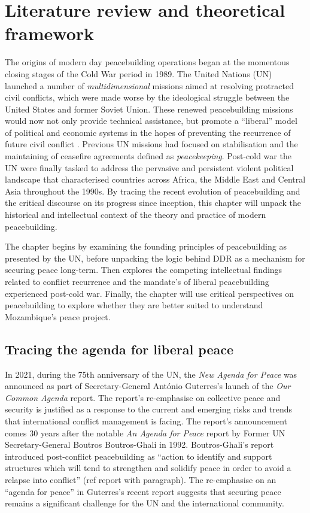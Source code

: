 \chapter{Literature review and theoretical framework}
\label{chp:Lit}

The origins of modern day peacebuilding operations began at the momentous closing stages of the Cold War period in 1989. The United Nations (UN) launched a number of \emph{multidimensional} missions aimed at resolving protracted civil conflicts, which were made worse by the ideological struggle between the United States and former Soviet Union. These renewed peacebuilding missions would now not only provide technical assistance, but promote a ``liberal'' model of political and economic systems in the hopes of preventing the recurrence of future civil conflict \citep[chap.~2]{paris2004war}. Previous UN missions had focused on stabilisation and the maintaining of ceasefire agreements defined as \emph{peacekeeping}. Post-cold war the UN were finally tasked to address the pervasive and persistent violent political landscape that characterised countries across Africa, the Middle East and Central Asia throughout the 1990s. By tracing the recent evolution of peacebuilding and the critical discourse on its progress since inception, this chapter will unpack the historical and intellectual context of the theory and practice of modern peacebuilding. 

The chapter begins by examining the founding principles of peacebuilding as presented by the UN, before unpacking the logic behind DDR as a mechanism for securing peace long-term. Then explores the competing intellectual findings related to conflict recurrence and the mandate's of liberal peacebuilding experienced post-cold war. Finally, the chapter will use critical perspectives on peacebuilding to explore whether they are better suited to understand Mozambique's peace project.  

\section{Tracing the agenda for liberal peace}

In 2021, during the 75th anniversary of the UN, the \emph{New Agenda for Peace} was announced as part of Secretary-General Ant\'{o}nio Guterres's launch of the \emph{Our Common Agenda} report. The report's re-emphasise on collective peace and security is justified as a response to the current and emerging risks and trends that international conflict management is facing. The report's announcement comes 30 years after the notable \emph{An Agenda for Peace} report by Former UN Secretary-General Boutros Boutros-Ghali in 1992. Boutros-Ghali's report introduced post-conflict peacebuilding as ``action to identify and support structures which will tend to strengthen and solidify peace in order to avoid a relapse into conflict'' (ref report with paragraph).  The re-emphasise on an ``agenda for peace'' in Guterres's recent report suggests that securing peace remains a significant challenge for the UN and the international community. 

